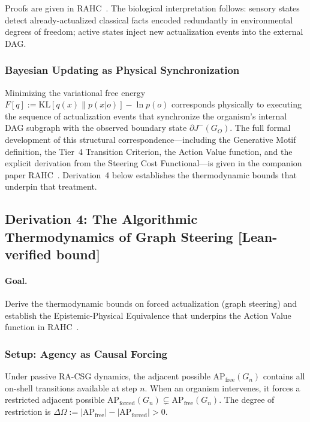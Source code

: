 \documentclass[11pt,a4paper]{article}
\theoremstyle{plain}
\theoremstyle{definition}
\theoremstyle{remark}
\newcommand{\AP}{\mathrm{AP}}
\begin{document}
Proofs are given in RAHC~\citep{Sandeman2026RAHC}. The biological interpretation
follows: sensory states detect already-actualized classical facts encoded
redundantly in environmental degrees of freedom; active states inject new
actualization events into the external DAG.

\subsubsection{Bayesian Updating as Physical Synchronization}

Minimizing the variational free energy~\citep{Friston2010}
$F[q] := \mathrm{KL}[q(x) \| p(x|o)] - \ln p(o)$
corresponds physically to executing the sequence of actualization events that
synchronize the organism's internal DAG subgraph with the observed boundary state
$\partial J^{-}(G_{O})$. The full formal development of this structural
correspondence---including the Generative Motif definition, the Tier~4 Transition
Criterion, the Action Value function, and the explicit derivation from the Steering
Cost Functional---is given in the companion paper RAHC~\citep{Sandeman2026RAHC}.
Derivation~4 below establishes the thermodynamic bounds that underpin that treatment.

\subsection{Derivation 4: The Algorithmic Thermodynamics of Graph Steering
\textnormal{[\textbf{Lean-verified bound}]}}
\label{sec:steering}

\paragraph{Goal.} Derive the thermodynamic bounds on forced actualization (graph
steering) and establish the Epistemic-Physical Equivalence that underpins the
Action Value function in RAHC~\citep{Sandeman2026RAHC}.

\subsubsection{Setup: Agency as Causal Forcing}

Under passive RA-CSG dynamics, the adjacent possible $\AP_{\mathrm{free}}(G_{n})$
contains all on-shell transitions available at step $n$. When an organism
intervenes, it forces a restricted adjacent possible $\AP_{\mathrm{forced}}(G_{n})
\subsetneq \AP_{\mathrm{free}}(G_{n})$. The degree of restriction is $\Delta\Omega
:= |\AP_{\mathrm{free}}| - |\AP_{\mathrm{forced}}| > 0$.
\end{document}
